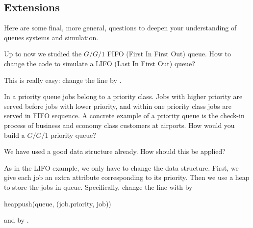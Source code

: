 \subsection{Extensions}
\label{sec:extensions}

Here are some final, more general, questions to deepen your understanding of queues systems and simulation. 

\begin{exercise}
  Up to now we studied the $G/G/1$ FIFO (First In First Out) queue. How to change the code to simulate a LIFO (Last In First Out) queue?
  \begin{solution}
    This is really easy: change the line  by  . 
 \end{solution}
\end{exercise}

\begin{exercise}
  In a priority queue  jobs belong to a priority class. Jobs with higher priority are served before jobs with lower priority, and within one priority class jobs are served in FIFO sequence. A concrete example of a priority queue is the check-in process of business and economy class customers at airports.  How would you build a $G/G/1$ priority queue?
  \begin{hint}
We have used a good data structure already. How should this be applied?
  \end{hint}
\begin{solution}
  As in the LIFO example, we only have to change the data structure. First, we give each job an extra attribute corresponding to its priority. Then we use a heap to store the jobs in queue. Specifically,  change the line with
   by
  \begin{pyblock}
heappush(queue, (job.priority, job))
  \end{pyblock}
and  by . 

\end{solution}
\end{exercise}

